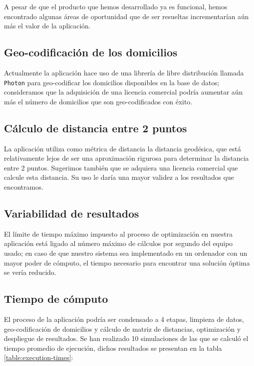 \documentclass[journal]{IEEEtran}
\begin{document}
        A pesar de que el producto que hemos desarrollado ya es funcional, hemos encontrado algunas áreas de oportunidad que de ser resueltas incrementarían aún más el valor de la aplicación.
        
        \subsection{Geo-codificación de los domicilios}
            
            Actualmente la aplicación hace uso de una librería de libre distribución llamada \texttt{Photon} para geo-codificar los domicilios disponibles en la base de datos; consideramos que la adquisición de una licencia comercial podría aumentar aún más el número de domicilios que son geo-codificados con éxito.
            
        \subsection{Cálculo de distancia entre 2 puntos}
            
            La aplicación utiliza como métrica de distancia la distancia geodésica, que está relativamente lejos de ser una aproximación rigurosa para determinar la distancia entre 2 puntos. Sugerimos también que se adquiera una licencia comercial que calcule esta distancia. Su uso le daría una mayor validez a los resultados que encontramos.
        
        \subsection{Variabilidad de resultados}

            El límite de tiempo máximo impuesto al proceso de optimización en nuestra aplicación está ligado al número máximo de cálculos por segundo del equipo usado; en caso de que nuestro sistema sea implementado en un ordenador con un mayor poder de cómputo, el tiempo necesario para encontrar una solución óptima se vería reducido.

        \subsection{Tiempo de cómputo}

            El proceso de la aplicación podría ser condensado a 4 etapas, limpieza de datos, geo-codificación de domicilios y cálculo de matriz de distancias, optimización y despliegue de resultados. Se han realizado 10 simulaciones de las que se calculó el tiempo promedio de ejecución, dichos resultados se presentan en la tabla \ref{table:execution-times}:
\end{document}
